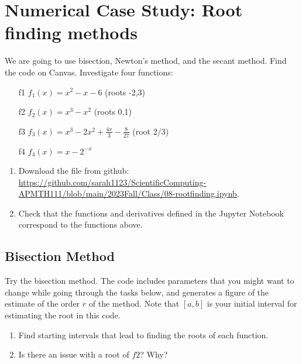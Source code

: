 \documentclass[12pt,letterpaper,noanswers]{exam}
\begin{document}
\eject
\section*{Numerical Case Study: Root finding methods}

We are going to use bisection, Newton's method, and the secant method.  Find the code on Canvas.  Investigate four functions:
\begin{enumerate}
\item[f1] $f_1(x) = x^2 - x - 6$ (roots -2,3)
\item[f2] $f_2(x) = x^3 - x^2$ (roots 0,1)
\item[f3] $f_3(x) = x^3 - 2x^2 + \frac{4x}{3} - \frac{8}{27}$ (root 2/3)
\item[f4] $f_4(x) = x - 2^{-x}$
\end{enumerate}
\begin{enumerate}[resume=classQ]
    \item Download the file from github: \url{https://github.com/sarah1123/ScientificComputing-APMTH111/blob/main/2023Fall/Class/08-rootfinding.ipynb}.
    \item Check that the functions and derivatives defined in the Jupyter Notebook correspond to the functions above.
\end{enumerate}



\subsection*{Bisection Method}

\noindent
Try the bisection method. The code includes parameters that you might want to change while going through the tasks below, and generates a figure of the estimate of the order $r$ of the method.  Note that $[a,b]$ is your initial interval for estimating the root in this code. 

\begin{enumerate}[resume=classQ]
\item Find starting intervals that lead to finding the roots of each function.

\vfill

\item Is there an issue with a root of $f2$? Why?

\vfill



\end{enumerate}
\end{document}

